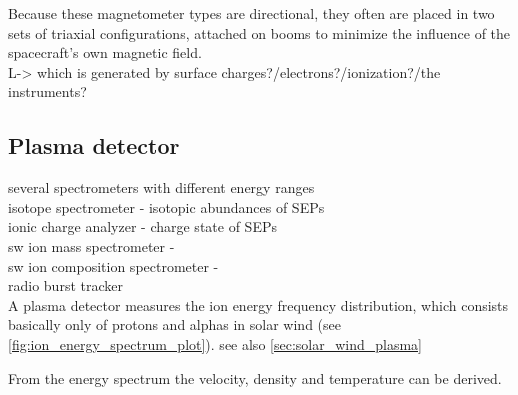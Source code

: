 Because these magnetometer types are directional, they often are placed in two sets of triaxial configurations, attached on booms to minimize the influence of the spacecraft's own magnetic field.\\
L-> which is generated by surface charges?/electrons?/ionization?/the instruments?\\


\subsection{Plasma detector}

several spectrometers with different energy ranges\\

isotope spectrometer - isotopic abundances of SEPs\\
ionic charge analyzer - charge state of SEPs\\
sw ion mass spectrometer - \\
sw ion composition spectrometer - \\
radio burst tracker\\


A plasma detector measures the ion energy frequency distribution, which consists basically only of protons and alphas in solar wind (see \autoref{fig:ion_energy_spectrum_plot}). see also \autoref{sec:solar_wind_plasma}
\\
\begin{figure}[htb]
\end{figure}

From the energy spectrum the velocity, density and temperature can be derived.\\

